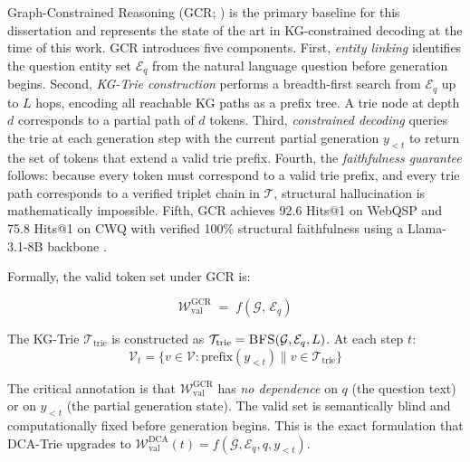 Graph-Constrained Reasoning (GCR; \citealt{luo2024gcr}) is the primary baseline
for this dissertation and represents the state of the art in KG-constrained
decoding at the time of this work. GCR introduces five components. First,
\textit{entity linking} identifies the question entity set $\mathcal{E}_q$ from
the natural language question before generation begins. Second,
\textit{KG-Trie construction} performs a breadth-first search from
$\mathcal{E}_q$ up to $L$ hops, encoding all reachable KG paths as a prefix
tree. A trie node at depth $d$ corresponds to a partial path of $d$ tokens.
Third, \textit{constrained decoding} queries the trie at each generation step
with the current partial generation $y_{<t}$ to return the set of tokens that
extend a valid trie prefix. Fourth, the \textit{faithfulness guarantee} follows:
because every token must correspond to a valid trie prefix, and every trie path
corresponds to a verified triplet chain in $\mathcal{T}$, structural hallucination
is mathematically impossible. Fifth, GCR achieves 92.6 Hits@1 on WebQSP and
75.8 Hits@1 on CWQ with verified 100\% structural faithfulness using a
Llama-3.1-8B backbone \citep{luo2024gcr}.

Formally, the valid token set under GCR is:

\begin{equation}
    \mathcal{W}_{\text{val}}^{\text{GCR}} \;=\; f(\mathcal{G},\, \mathcal{E}_q)
    \label{eq:gcr}
\end{equation}

The KG-Trie $\mathcal{T}_{\text{trie}}$ is constructed as
$\mathcal{T}_{\text{trie}} = \textsc{BFS}(\mathcal{G}, \mathcal{E}_q, L)$.
At each step $t$:
\[
    \mathcal{V}_t = \bigl\{v \in \mathcal{V} : \text{prefix}(y_{<t}) \| v \in
    \mathcal{T}_{\text{trie}}\bigr\}
\]

The critical annotation is that $\mathcal{W}_{\text{val}}^{\text{GCR}}$ has
\textit{no dependence} on $q$ (the question text) or on $y_{<t}$ (the partial
generation state). The valid set is semantically blind and computationally fixed
before generation begins. This is the exact formulation that DCA-Trie upgrades
to $\mathcal{W}_{\text{val}}^{\text{DCA}}(t) = f(\mathcal{G}, \mathcal{E}_q, q,
    y_{<t})$.

